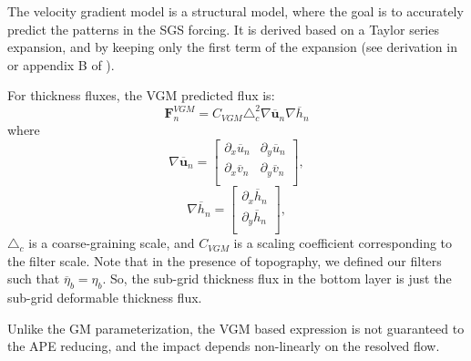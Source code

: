 \documentclass[draft]{agujournal2019}
\begin{document}
The velocity gradient model is a structural model, where the goal is to accurately predict the patterns in the SGS forcing.  It is derived based on a Taylor series expansion, and by keeping only the first term of the expansion (see derivation in  or appendix B of ). 


For thickness fluxes, the VGM predicted flux is: 
\begin{equation}
    \mathbf{F}_n^{VGM} = C_{VGM} \triangle_c^2 \nabla \overline{\mathbf{u}}_n \nabla \overline{h}_n
\end{equation}
where 
\begin{equation}
    \nabla \overline{\mathbf{u}}_n = 
    \begin{bmatrix}
        \partial_x \overline{u}_n & \partial_y \overline{u}_n \\
        \partial_x \overline{v}_n & \partial_y \overline{v}_n \\
    \end{bmatrix},
\end{equation} 
\begin{equation}
    \nabla \overline{h}_n = 
    \begin{bmatrix}
        \partial_x \overline{h}_n \\
        \partial_y \overline{h}_n \\
    \end{bmatrix},
\end{equation}
$\triangle_c$ is a coarse-graining scale, and $C_{VGM}$ is a scaling coefficient corresponding to the filter scale. Note that in the presence of topography, we defined our filters such that $\overline{\eta}_b = \eta_b$. So, the sub-grid thickness flux in the bottom layer is just the sub-grid deformable thickness flux. 

Unlike the GM parameterization, the VGM based expression is not guaranteed to the APE reducing, and the impact depends non-linearly on the resolved flow.

\end{document}
